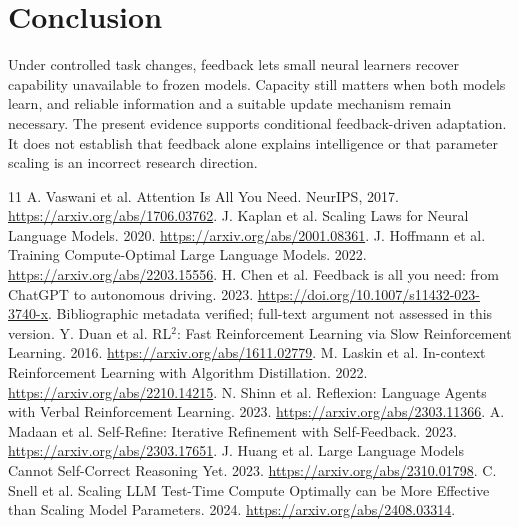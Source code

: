 \documentclass[11pt]{article}
\begin{document}
\section{Conclusion}
Under controlled task changes, feedback lets small neural learners recover
capability unavailable to frozen models. Capacity still matters when both
models learn, and reliable information and a suitable update mechanism remain
necessary. The present evidence supports conditional feedback-driven
adaptation. It does not establish that feedback alone explains intelligence
or that parameter scaling is an incorrect research direction.

\begin{thebibliography}{11}
 A. Vaswani et al. Attention Is All You Need. NeurIPS, 2017.
\url{https://arxiv.org/abs/1706.03762}.
 J. Kaplan et al. Scaling Laws for Neural Language Models. 2020.
\url{https://arxiv.org/abs/2001.08361}.
 J. Hoffmann et al. Training Compute-Optimal Large Language Models. 2022.
\url{https://arxiv.org/abs/2203.15556}.
 H. Chen et al. Feedback is all you need: from ChatGPT to autonomous driving. 2023.
\url{https://doi.org/10.1007/s11432-023-3740-x}. Bibliographic metadata verified;
full-text argument not assessed in this version.
 Y. Duan et al. RL$^2$: Fast Reinforcement Learning via Slow Reinforcement Learning. 2016.
\url{https://arxiv.org/abs/1611.02779}.
 M. Laskin et al. In-context Reinforcement Learning with Algorithm Distillation. 2022.
\url{https://arxiv.org/abs/2210.14215}.
 N. Shinn et al. Reflexion: Language Agents with Verbal Reinforcement Learning. 2023.
\url{https://arxiv.org/abs/2303.11366}.
 A. Madaan et al. Self-Refine: Iterative Refinement with Self-Feedback. 2023.
\url{https://arxiv.org/abs/2303.17651}.
 J. Huang et al. Large Language Models Cannot Self-Correct Reasoning Yet. 2023.
\url{https://arxiv.org/abs/2310.01798}.
 C. Snell et al. Scaling LLM Test-Time Compute Optimally can be More Effective than Scaling Model Parameters. 2024.
\url{https://arxiv.org/abs/2408.03314}.
\end{thebibliography}
\end{document}
